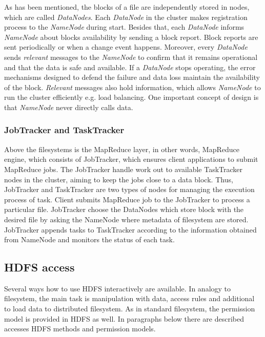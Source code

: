 \documentclass[a4paper,12pt,oneside]{report}
\begin{document}
	As has been mentioned, the blocks of a file are independently stored in nodes,
	which are called
	\textit{DataNodes}. Each \textit{DataNode} in the cluster makes registration
	process to the \textit{NameNode} during start. 
	Besides that, each \textit{DataNode} informs \textit{NameNode} about blocks
	availability by sending a block report. 
	Block reports are sent periodically or when a change event happens. Moreover,
	every \textit{DataNode} sends 
	\emph{relevant} messages to the \textit{NameNode} to confirm that
	it remains operational and that the data is safe and available. If a
	\textit{DataNode} stops operating, the error 
	mechanisms designed to defend the failure and data loss maintain the
	availability of the block.
	\emph{Relevant} messages also hold information, which allows \textit{NameNode}
	to run the cluster efficiently e.g. 
	load balancing. One important concept of design  is that \textit{NameNode} never
	directly calls data.
	
	
	\subsubsection{JobTracker and TaskTracker}
	Above the filesystems is  the MapReduce layer, in other words, MapReduce engine,
	which consists of 
	JobTracker,  which ensures client applications to submit Map\-Reduce jobs. The
	JobTracker handle work 
	out to available TaskTracker nodes in the cluster, 
	aiming to keep the jobs close to a data block.  Thus, JobTracker and TaskTracker
	are two types of 
	nodes for managing the execution process of  task.
	Client submits MapReduce job  to the JobTracker to process a particular file.
	JobTracker choose the 
	DataNodes which store block with the desired file by asking the NameNode where 
	metadata of filesystem are stored. 
	JobTracker appends tasks to TaskTracker according to the  information obtained
	from NameNode and monitors the status of each task.
	
	
	\subsection{HDFS access} 
	Several ways how to use HDFS interactively are available. In analogy to
	filesystem, the main task is manipulation with data, access rules and additional
	to load data to distributed filesystem. As in standard filesystem, the permission model is
	provided in HDFS as well. 
	In paragraphs below there are described accesses  HDFS 	
	methods and permission models.
	
\end{document}
